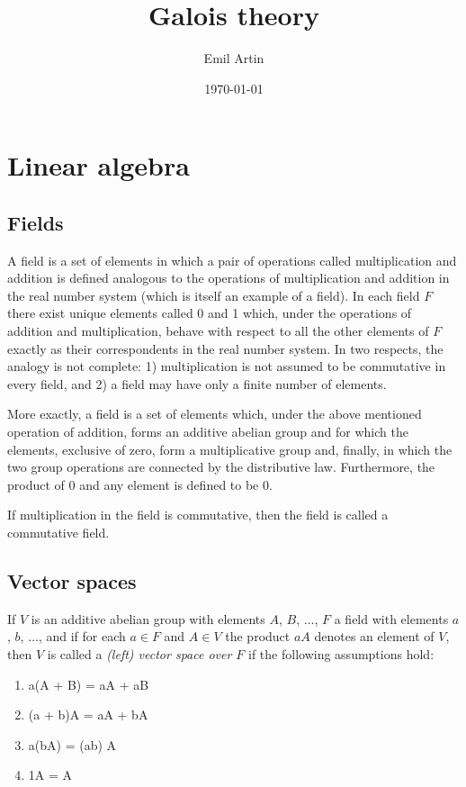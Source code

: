 \documentclass[10pt,leqno]{article}
\author{Emil Artin}
\date{\today}
\title{Galois theory}
\theoremstyle{definition}
\begin{document}
\maketitle



\section{Linear algebra}


\subsection{Fields}


A field is a set of elements in which a pair of operations called multiplication and addition is defined analogous to the operations of multiplication and addition in the real number system (which is itself an example of a field).
In each field $F$ there exist unique elements called 0 and 1 which, under the operations of addition and multiplication, behave with respect to all the other elements of $F$ exactly as their correspondents in the real number system.
In two respects, the analogy is not complete: 1) multiplication is not assumed to be commutative in every field, and 2) a field may have only a finite number of elements.

More exactly, a field is a set of elements which, under the above mentioned operation of addition, forms an additive abelian group and for which the elements, exclusive of zero, form a multiplicative group and, finally, in which the two group operations are connected by the distributive law.
Furthermore, the product of 0 and any element is defined to be 0.

If multiplication in the field is commutative, then the field is called a commutative field.


\subsection{Vector spaces}

If $V$ is an additive abelian group with elements $A$, $B$, $\ldots$, $F$ a field with elements $a$, $b$, $\ldots$, and if for each $a \in F$ and $A \in V$ the product $aA$ denotes an element of $V$, then $V$ is called a \emph{(left) vector space over $F$} if the following assumptions hold:

\begin{enumerate}
\item
a(A + B) = aA + aB

\item
(a + b)A = aA + bA

\item
a(bA) = (ab) A

\item
1A = A
\end{enumerate}
\end{document}
